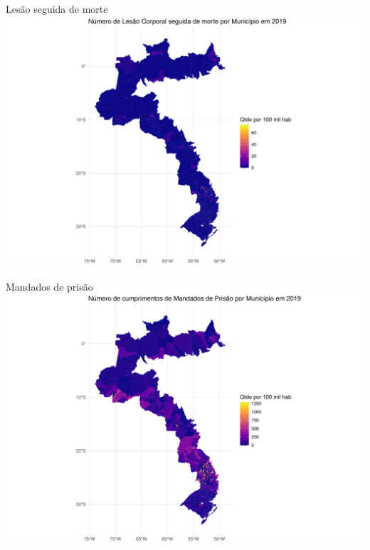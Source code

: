 \documentclass[
  ignorenonframetext,
]{beamer}
\begin{document}
\begin{frame}{Lesão seguida de morte}
\label{lesuxe3o-seguida-de-morte}
\includegraphics{graficos_files/figure-beamer/unnamed-chunk-21-1.pdf}
\end{frame}

\begin{frame}{Mandados de prisão}
\label{mandados-de-prisuxe3o}
\includegraphics{graficos_files/figure-beamer/unnamed-chunk-22-1.pdf}
\end{frame}
\end{document}
